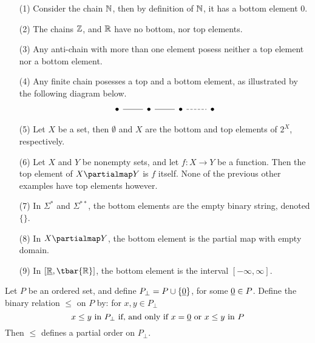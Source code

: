 \begin{example}
  \begin{enumerate}
    \item[(1)] Consider the chain $\mathbb{N}$, then by definition of $\mathbb{N}$, it
      has a bottom element $0$.

    \item[(2)] The chains $\mathbb{Z}$, and $\mathbb{R}$ have no bottom, nor top
      elements.

    \item[(3)] Any anti-chain with more than one element posess
      neither a top element nor a bottom element.

    \item[(4)] Any finite chain posesses a top and a bottom element,
      as illustrated by the following diagram below.
      \[\begin{tikzcd}
        \bullet & \bullet & \bullet & \bullet
        \arrow[no head, from=1-1, to=1-2]
        \arrow[no head, from=1-2, to=1-3]
        \arrow[dashed, no head, from=1-3, to=1-4]
      \end{tikzcd}\]

      \item[(5)] Let $X$ be a set, then  $\emptyset$ and $X$ are the
        bottom and top elements of $2^X$, respectively.

      \item[(6)] Let $X$ and $Y$ be nonempty sets, and let $f:X
        \xrightarrow{} Y$ be a function. Then the top element of $X
        \partialmap Y$ is $f$ itself. None of the previous other
        examples have top elements however.

      \item[(7)] In $\Sigma^\ast$ and $\Sigma^{\ast\ast}$, the bottom
        elements are the empty binary string, denoted $\{\}$.

      \item[(8)] In $X \partialmap Y$, the bottom element is the
        partial map with empty domain.

      \item[(9)] In $[\bbar{\R},\tbar{\R}]$, the bottom element is the
        interval $[-\infty, \infty]$.
  \end{enumerate}
\end{example}

\begin{proposition}\label{proposition_1.4.5}
  Let $P$ be an ordered set, and define $P_\bot=P \cup \{\underline{0}\}$,
  for some $\underline{0} \in P$. Define the binary relation $\leq$ on $P$
  by: for $x,y \in P_\bot$
  \begin{equation*}
    x \leq y \text{ in } P_\bot \text{ if, and only if }
    x=\underline{0} \text{ or } x \leq y \text{ in } P
  \end{equation*}
  Then $\leq$ defines a partial order on $P_\bot$.
\end{proposition}

